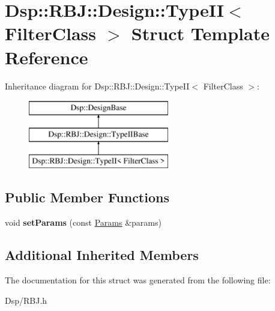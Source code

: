 \hypertarget{structDsp_1_1RBJ_1_1Design_1_1TypeII}{\section{Dsp\-:\-:R\-B\-J\-:\-:Design\-:\-:Type\-I\-I$<$ Filter\-Class $>$ Struct Template Reference}
\label{structDsp_1_1RBJ_1_1Design_1_1TypeII}
}
Inheritance diagram for Dsp\-:\-:R\-B\-J\-:\-:Design\-:\-:Type\-I\-I$<$ Filter\-Class $>$\-:\begin{figure}[H]
\begin{center}
\leavevmode
\includegraphics[height=3.000000cm]{structDsp_1_1RBJ_1_1Design_1_1TypeII}
\end{center}
\end{figure}
\subsection*{Public Member Functions}
\begin{DoxyCompactItemize}
\item 
\hypertarget{structDsp_1_1RBJ_1_1Design_1_1TypeII_a1b1c68d9cfdf9c4e5654576324589ae6}{void {\bfseries set\-Params} (const \hyperlink{structDsp_1_1Params}{Params} \&params)}\label{structDsp_1_1RBJ_1_1Design_1_1TypeII_a1b1c68d9cfdf9c4e5654576324589ae6}

\end{DoxyCompactItemize}
\subsection*{Additional Inherited Members}


The documentation for this struct was generated from the following file\-:\begin{DoxyCompactItemize}
\item 
Dsp/R\-B\-J.\-h\end{DoxyCompactItemize}
